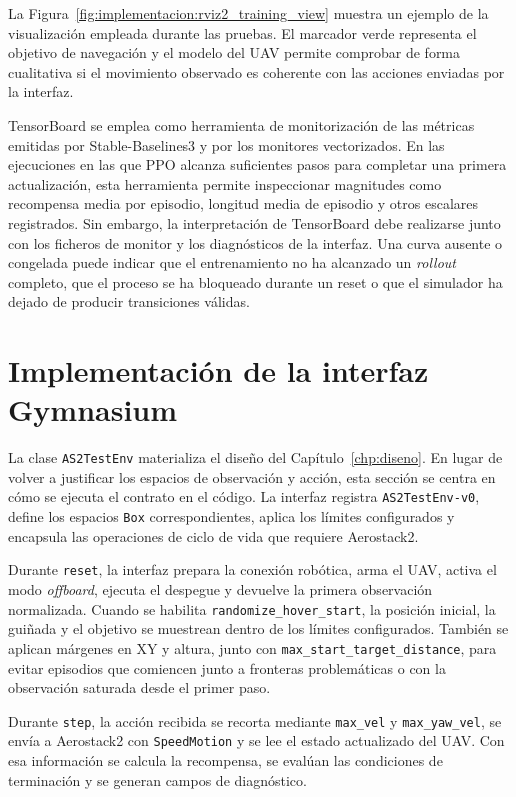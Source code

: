 La Figura~\ref{fig:implementacion:rviz2_training_view} muestra un ejemplo de la
visualización empleada durante las pruebas. El marcador verde representa el
objetivo de navegación y el modelo del UAV permite comprobar de forma cualitativa
si el movimiento observado es coherente con las acciones enviadas por la interfaz.

TensorBoard se emplea como herramienta de monitorización de las métricas emitidas
por Stable-Baselines3 y por los monitores vectorizados. En las ejecuciones en las
que PPO alcanza suficientes pasos para completar una primera actualización, esta
herramienta permite inspeccionar magnitudes como recompensa media por episodio,
longitud media de episodio y otros escalares registrados. Sin embargo, la
interpretación de TensorBoard debe realizarse junto con los ficheros de monitor y
los diagnósticos de la interfaz. Una curva ausente o congelada puede indicar que el
entrenamiento no ha alcanzado un \emph{rollout} completo, que el proceso se ha
bloqueado durante un reset o que el simulador ha dejado de producir transiciones
válidas.


\section{Implementación de la interfaz Gymnasium} \label{sct:implementacion:entorno}

La clase \texttt{AS2TestEnv} materializa el diseño del
Capítulo~\ref{chp:diseno}. En lugar de volver a justificar los espacios de
observación y acción, esta sección se centra en cómo se ejecuta el contrato en el
código. La interfaz registra \texttt{AS2TestEnv-v0}, define los espacios
\texttt{Box} correspondientes, aplica los límites configurados y encapsula las
operaciones de ciclo de vida que requiere Aerostack2.

Durante \texttt{reset}, la interfaz prepara la conexión robótica, arma el UAV,
activa el modo \emph{offboard}, ejecuta el despegue y devuelve la primera
observación normalizada. Cuando se habilita \texttt{randomize\_hover\_start}, la
posición inicial, la guiñada y el objetivo se muestrean dentro de los límites
configurados. También se aplican márgenes en XY y altura, junto con
\texttt{max\_start\_target\_distance}, para evitar episodios que comiencen junto
a fronteras problemáticas o con la observación saturada desde el primer paso.

Durante \texttt{step}, la acción recibida se recorta mediante \texttt{max\_vel} y
\texttt{max\_yaw\_vel}, se envía a Aerostack2 con \texttt{SpeedMotion} y se lee el
estado actualizado del UAV. Con esa información se calcula la recompensa, se
evalúan las condiciones de terminación y se generan campos de diagnóstico.

